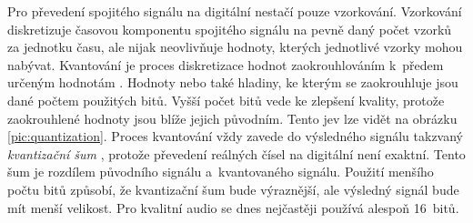 Pro převedení spojitého signálu na digitální nestačí pouze vzorkování.
Vzorkování diskretizuje časovou komponentu spojitého signálu na pevně daný
počet vzorků za jednotku času, ale nijak neovlivňuje hodnoty, kterých
jednotlivé vzorky mohou nabývat. Kvantování je proces diskretizace hodnot
zaokrouhlováním k~předem určeným hodnotám \cite{Oliver1948}. Hodnoty nebo také
hladiny, ke kterým se zaokrouhluje jsou dané počtem použitých bitů. Vyšší počet
bitů vede ke zlepšení kvality, protože zaokrouhlené hodnoty jsou blíže jejich
původním. Tento jev lze vidět na obrázku \ref{pic:quantization}. Proces
kvantování vždy zavede do výsledného signálu takzvaný \textit{kvantizační šum}
\cite{Oliver1948}, protože převedení reálných čísel na digitální není exaktní.
Tento šum je rozdílem původního signálu a~kvantovaného signálu. Použití menšího
počtu bitů způsobí, že kvantizační šum bude výraznější, ale výsledný signál
bude mít menší velikost. Pro kvalitní audio se dnes nejčastěji používá alespoň
16~bitů.

